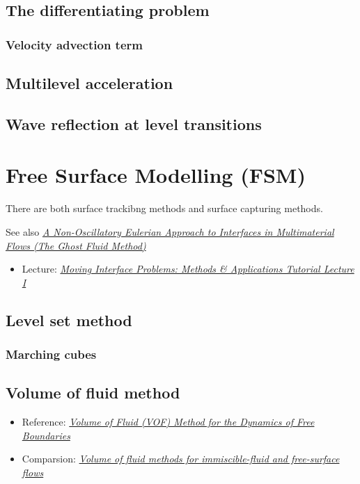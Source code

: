 \section{The differentiating problem}

\subsection{Velocity advection term}

\section{Multilevel acceleration}

\section{Wave reflection at level transitions}

\chapter{Free Surface Modelling (FSM)}

There are both surface trackibng methods and surface capturing methods.

See also \textit{\href{http://physbam.stanford.edu/~fedkiw/papers/cam1998-17.pdf}{A Non-Oscillatory Eulerian Approach to Interfaces in Multimaterial Flows (The Ghost Fluid Method)}}

\begin{itemize}
    \item Lecture: \textit{\href{http://www.ims.nus.edu.sg/Programs/fluiddynamic/files/Lecture1-basics.pdf}{Moving Interface Problems: Methods \& Applications Tutorial Lecture I}}
\end{itemize}

\section{Level set method}

\subsection{Marching cubes}

\section{Volume of fluid method}

\begin{itemize}
    \item Reference: \textit{\href{http://pages.csam.montclair.edu/~yecko/icodes/HirtNichols_Surfer_JCP1981.pdf}{Volume of Fluid (VOF) Method for the Dynamics of Free Boundaries}}
    \item Comparsion: \textit{\href{http://capfluidicslit.mme.pdx.edu/reference/Numerics/Gopala_ChemEngJ2008_VOFMethodsFreeSurfaceFlow.pdf}{Volume of fluid methods for immiscible-fluid and free-surface flows}}
\end{itemize}


